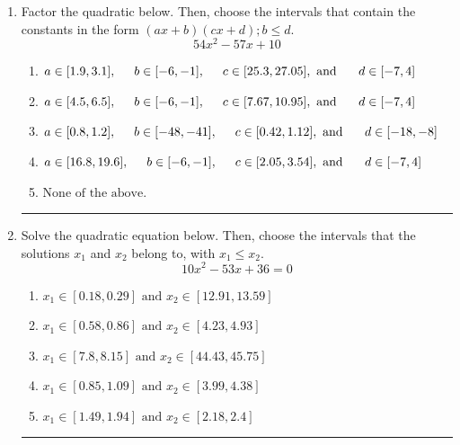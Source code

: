 \documentclass[14pt]{extbook}
\newcommand{\litem}[1]{\item#1\hspace*{-1cm}\rule{\textwidth}{0.4pt}}
\begin{document}
\begin{enumerate}
{\begin{enumerate}[label=\Alph*.]
\end{enumerate} }
\litem{
Factor the quadratic below. Then, choose the intervals that contain the constants in the form $(ax+b)(cx+d); b \leq d.$\[ 54x^{2} -57 x + 10 \]\begin{enumerate}[label=\Alph*.]
\item \( a \in [1.9, 3.1], \hspace*{5mm} b \in [-6, -1], \hspace*{5mm} c \in [25.3, 27.05], \text{ and } \hspace*{5mm} d \in [-7, 4] \)
\item \( a \in [4.5, 6.5], \hspace*{5mm} b \in [-6, -1], \hspace*{5mm} c \in [7.67, 10.95], \text{ and } \hspace*{5mm} d \in [-7, 4] \)
\item \( a \in [0.8, 1.2], \hspace*{5mm} b \in [-48, -41], \hspace*{5mm} c \in [0.42, 1.12], \text{ and } \hspace*{5mm} d \in [-18, -8] \)
\item \( a \in [16.8, 19.6], \hspace*{5mm} b \in [-6, -1], \hspace*{5mm} c \in [2.05, 3.54], \text{ and } \hspace*{5mm} d \in [-7, 4] \)
\item \( \text{None of the above.} \)

\end{enumerate} }
\litem{
Solve the quadratic equation below. Then, choose the intervals that the solutions $x_1$ and $x_2$ belong to, with $x_1 \leq x_2$.\[ 10x^{2} -53 x + 36 = 0 \]\begin{enumerate}[label=\Alph*.]
\item \( x_1 \in [0.18, 0.29] \text{ and } x_2 \in [12.91, 13.59] \)
\item \( x_1 \in [0.58, 0.86] \text{ and } x_2 \in [4.23, 4.93] \)
\item \( x_1 \in [7.8, 8.15] \text{ and } x_2 \in [44.43, 45.75] \)
\item \( x_1 \in [0.85, 1.09] \text{ and } x_2 \in [3.99, 4.38] \)
\item \( x_1 \in [1.49, 1.94] \text{ and } x_2 \in [2.18, 2.4] \)


\end{enumerate}}
\end{enumerate}
\end{document}
